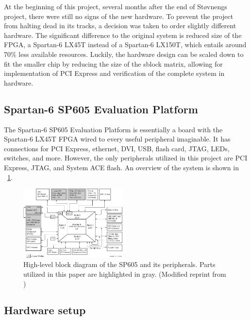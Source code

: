 At the beginning of this project, several months after the end of Støvnengs project, there were still no signs of the new hardware.
To prevent the project from halting dead in its tracks, a decision was taken to order slightly different hardware.
The significant difference to the original system is reduced size of the FPGA, a Spartan-6 LX45T instead of a Spartan-6 LX150T, which entails around 70\% less available resources.
Luckily, the hardware design can be scaled down to fit the smaller chip by reducing the size of the sblock matrix, allowing for implementation of PCI Express and verification of the complete system in hardware.

\subsection{Spartan-6 SP605 Evaluation Platform}

The Spartan-6 SP605 Evaluation Platform is essentially a board with the Spartan-6 LX45T FPGA wired to every useful peripheral imaginable.
It has connections for PCI Express, ethernet, DVI, USB, flash card, JTAG, LEDs, switches, and more.
However, the only peripherals utilized in this project are PCI Express, JTAG, and System ACE flash.
An overview of the system is shown in \figurename~\ref{fig:sp605}.

\begin{figure}[!ht]
    \centering
    \includegraphics[width=0.48\textwidth]{figures/sp605-modified}
    \caption{High-level block diagram of the SP605 and its peripherals. Parts utilized in this paper are highlighted in gray. (Modified reprint from \cite{ug526})}
    \label{fig:sp605}
\end{figure}




\subsection{Hardware setup}

